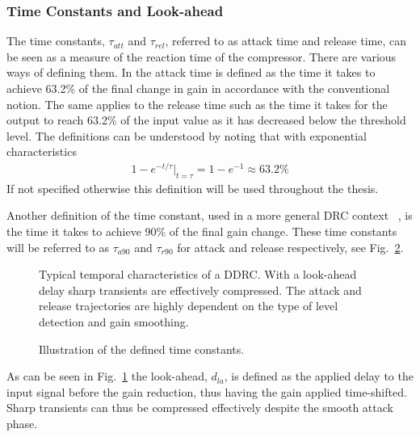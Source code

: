 \documentclass[../main2.tex]{subfiles}
\providecommand{\rootdir}{..}
\begin{document}
\subsubsection{Time Constants and Look-ahead}
The time constants, $\tau_{att}$ and $\tau_{rel}$, referred to as attack time and release time, can be seen as a measure of the reaction time of the compressor. There are various ways of defining them. In \cite{mcnally1984dynamic} the attack time is defined as the time it takes to achieve 63.2\% of the final change in gain in accordance with the conventional notion. The same applies to the release time such as the time it takes for the output to reach 63.2\% of the input value as it has decreased below the threshold level. The definitions can be understood by noting that with exponential characteristics
\begin{align}
1-e^{-t / \tau}\rvert_{t=\tau} = 1-e^{-1} \approx 63.2\% \label{eq:time_const}
\end{align}
If not specified otherwise this definition will be used throughout the thesis.

Another definition of the time constant, used in a more general DRC context ~\cite{mcnally1984dynamic}, is the time it takes to achieve 90\% of the final gain change. These time constants will be referred to as $\tau_{a90}$ and $\tau_{r90}$ for attack and release respectively, see Fig.~\ref{fig:time_constants}.
\begin{figure}
\centerline{}
\caption{Typical temporal characteristics of a DDRC. With a look-ahead delay sharp transients are effectively compressed. The attack and release trajectories are highly dependent on the type of level detection and gain smoothing.}
\label{fig:typical_envelope_detailed}
\end{figure}
\begin{figure}
\centerline{}
\caption{Illustration of the defined time constants.}
\label{fig:time_constants}
\end{figure}
As can be seen in Fig.~\ref{fig:typical_envelope_detailed} the look-ahead, $d_{la}$, is defined as the applied delay to the input signal before the gain reduction, thus having the gain applied time-shifted. Sharp transients can thus be compressed effectively despite the smooth attack phase.
\end{document}
